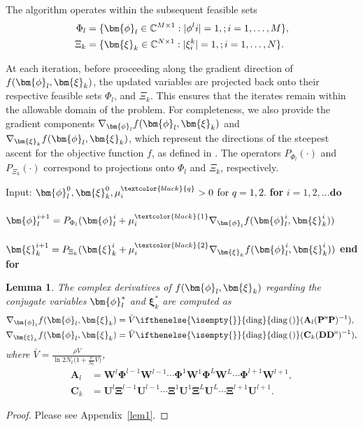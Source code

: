 \documentclass[twocolumn,10pt]{IEEEtran}
\newcommand{\vect}[1]{{\lowercase{\mbs{#1}}}}
\newcommand{\mbs}[1]{\bm{#1}}
\renewcommand{\H}{{\scriptscriptstyle\mathsf{H}}}
\newcommand{\bphi}{\vect{\phi}}
\def\bA{{\mathbf{A}}}
\def\bC{{\mathbf{C}}}
\def\bD{{\mathbf{D}}}
\def\bP{{\mathbf{P}}}
\def\bU{{\mathbf{U}}}
\def\bW{{\mathbf{W}}}
\def\bxi{{\bm{\xi}}}
\def\bxi{{\bm{\xi}}}
\def\bXi{{\boldsymbol{\Xi}}}
\newcommand{\diag}[1][]{\ifthenelse{\isempty{#1}}{\text{diag}}{\text{diag}\left(#1\right)}}
\newtheorem{lemma}{Lemma}%
\def\bPhi{{\boldsymbol{\Phi}}}
\def\bXi{{\boldsymbol{\Xi}}}
\begin{document}
	The algorithm operates within the subsequent feasible sets
	\begin{align}
		\Phi_{l}&=\{\bphi_{l}\in \mathbb{C}^{M \times 1}: |\phi^{l}{i}|=1, ; i=1,\ldots, M\},\\
		\Xi_{k}&=\{\bxi_{k}\in \mathbb{C}^{N \times 1}: |\xi^{k}_{i}|=1, ; i=1,\ldots, N\}.
	\end{align}
	
	At each iteration, before proceeding along the gradient direction of 	$ f(\bphi_{l},\bxi_{k}) $, the updated variables are projected back onto their respective feasible sets 
	$ \Phi_{l} $, and $ \Xi_{k} $. This ensures that the iterates remain within the allowable domain of the problem. For completeness, we also provide the gradient components 
	$\nabla_{\bphi_{l}}f(\bphi_{l},\bxi_{k}) $ and $ \nabla_{\bxi_{k}}f(\bphi_{l},\bxi_{k}) $, which represent the directions of the steepest ascent for the objective function $f$, as defined in \cite[Theorem 3.4]{hjorungnes:2011}. 	The operators 	$ P_{\Phi_{l}}(\cdot) $ and $ P_{\Xi_{k}}(\cdot) $ correspond to projections onto 
	$ \Phi_{l} $ and $ \Xi_{k} $, respectively.
	
	\begin{algorithm}[th]
		\caption{Projected Gradient Ascent Method \label{Algoa1}}
		\begin{algorithmic}[1]
			\STATE Input: $\bphi_{l}^{0},\bxi_{k}^{0},\mu_{i}^{\textcolor{black}{q}}>0$ \textcolor{black}{for $ q=1,2 $}.
			\STATE \textbf{for} $ i=1,2,\ldots \textbf{do} $
			\STATE ~~~~~$\bphi_{l}^{i+1}=P_{\Phi_{l}}(\bphi_{l}^{i}+\mu_{i}^{\textcolor{black}{1}}\nabla_{\bphi_{l}}f(\bphi_{l}^{i},\bxi_{k}^{i}))$
			\STATE ~~~~~$\bxi_{k}^{i+1}=P_{\Xi_{k}}(\bxi_{k}^{i}+\mu_{i}^{\textcolor{black}{2}}\nabla_{\bxi_{k}}f(\bphi_{l}^{i},\bxi_{k}^{i}))$
			\STATE \textbf{end for}
		\end{algorithmic}
	\end{algorithm} 	
	
	
	
	\begin{lemma}\label{lemmaGradient}
		The complex derivatives of 	$f(\bphi_{l},\bxi_{k}) $
		regarding the conjugate variables 
		$\bphi_{l}^{*}$ and $\bxi_{k}^{*}$	are computed as  
		\begin{align}
			\nabla_{\bphi_{l}}f(\bphi_{l},\bxi_{k})&=\bar{V}\diag(\bA_{l}(\bP^{\H}\bP)^{-1} ) ,\label{gradient2}\\
			\nabla_{\bxi_{k}}f(\bphi_{l},\bxi_{k})&=\bar{V}\diag(\bC_{k}(\bD\bD^{\H})^{-1} ) ,\label{gradient3}
		\end{align}
		where $\bar{V}=\frac{\rho V}{  \ln2 N_{t}  \bigg(\!\!1+\frac{\rho}{N_{t}} V\!\bigg)}$, 
		\begin{align}
			\bA_{l}&\!=\!\bW^{l}\bPhi^{l-1}\bW^{l-1}\!\cdots\! \bPhi^{1}\bW^{1}\bPhi^{L}\bW^{L}\cdots\bPhi^{l+1}\bW^{l+1},\\
				\bC_{k}&\!=\!\bU^{l}\bXi^{l-1}\bU^{l-1}\!\cdots\! \bXi^{1}\bU^{1}\bXi^{L}\bU^{L}\cdots\bXi^{l+1}\bU^{l+1}.
		\end{align}
	\end{lemma}
	\begin{proof}
		Please see Appendix~\ref{lem1}.	
	\end{proof}
	
\end{document}
